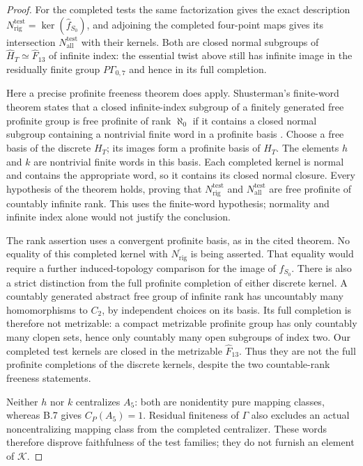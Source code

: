 \begin{proof}
For the completed tests the same factorization gives
the exact description
$N_{\mathrm{rig}}^{\mathrm{test}}=\ker(\widehat f_{S_0})$,
and adjoining the completed four-point maps gives its
intersection $N_{\mathrm{all}}^{\mathrm{test}}$ with their
kernels.  Both are closed normal subgroups of
$\widehat H_T\simeq\widehat F_{13}$ of infinite index:
the essential twist above still has infinite image in
the residually finite group $P\Gamma_{0,7}$ and hence
in its full completion.

Here a precise profinite freeness theorem does apply.
Shusterman's finite-word theorem states that a closed
infinite-index subgroup of a finitely generated free
profinite group is free profinite of rank $\aleph_0$
if it contains a closed normal subgroup containing
a nontrivial finite word in a profinite basis
\cite[Theorem 1.2; Corollary 3.7 in the primary preprint]{DE_Shusterman2016}.
Choose a free basis of the discrete $H_T$; its images
form a profinite basis of $\widehat H_T$.
The elements $h$ and $k$ are nontrivial finite words
in this basis.  Each completed kernel is normal and
contains the appropriate word, so it contains its
closed normal closure.  Every hypothesis of the theorem
holds, proving that
$N_{\mathrm{rig}}^{\mathrm{test}}$ and
$N_{\mathrm{all}}^{\mathrm{test}}$ are free profinite of
countably infinite rank.  This uses the finite-word
hypothesis; normality and infinite index alone would
not justify the conclusion.

The rank assertion uses a convergent profinite basis,
as in the cited theorem.
No equality of this completed kernel with
$\overline{N_{\mathrm{rig}}}$ is being asserted.
That equality would require a further induced-topology
comparison for the image of $f_{S_0}$.
There is also a strict distinction from the full profinite
completion of either discrete kernel.  A countably generated
abstract free group of infinite rank has uncountably many
homomorphisms to $C_2$, by independent choices on its basis.
Its full completion is therefore not metrizable: a compact
metrizable profinite group has only countably many clopen
sets, hence only countably many open subgroups of index two.
Our completed test kernels are closed in the metrizable
$\widehat F_{13}$.  Thus they are not the full profinite
completions of the discrete kernels, despite the two
countable-rank freeness statements.

Neither $h$ nor $k$ centralizes $A_5$: both are nonidentity
pure mapping classes, whereas B.7 gives
$C_P(A_5)=1$.  Residual finiteness of $\Gamma$ also excludes
an actual noncentralizing mapping class from the completed
centralizer.  These words therefore disprove faithfulness
of the test families; they do not furnish an element of
$\mathcal K$.


\end{proof}
